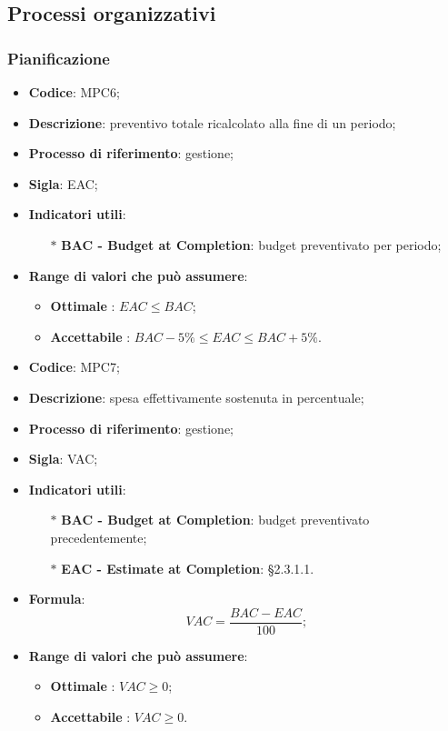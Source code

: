 \subsection{Processi organizzativi}
\subsubsection{Pianificazione}
\vspace{-1cm}
\begin{itemize}
	\item \textbf{Codice}: MPC6;
	\item \textbf{Descrizione}: preventivo totale ricalcolato alla fine di un periodo;
	\item \textbf{Processo di riferimento}: gestione;
	\item \textbf{Sigla}: EAC;
	\item \textbf{Indicatori utili}: 
		\begin{itemize}
		\item[$\ast$] \textbf{BAC - Budget at Completion}: budget preventivato per periodo;
		\end{itemize}
	\item \textbf{Range di valori che può assumere}: 
		\begin{itemize}
			\item \textbf{Ottimale} : $EAC \leq BAC$;
			\item \textbf{Accettabile} : $BAC - 5 \% \leq EAC \leq BAC + 5 \%$.
		\end{itemize}
\end{itemize}
\vspace{-1cm}
\begin{itemize}
	\item \textbf{Codice}: MPC7;
	\item \textbf{Descrizione}: spesa effettivamente sostenuta in percentuale;
	\item \textbf{Processo di riferimento}: gestione;
	\item \textbf{Sigla}: VAC;
	\item \textbf{Indicatori utili}: 
		\begin{itemize}
		\item[$\ast$] \textbf{BAC - Budget at Completion}: budget preventivato precedentemente;
		\item[$\ast$] \textbf{EAC - Estimate at Completion}: §2.3.1.1.
		\end{itemize}
	\item \textbf{Formula}: \[ VAC = \frac{BAC - EAC}{100};\]
	\item \textbf{Range di valori che può assumere}: 
		\begin{itemize}
			\item \textbf{Ottimale} : $ VAC \geq 0 $;
			\item \textbf{Accettabile} : $ VAC \geq 0 $.
		\end{itemize}
\end{itemize}
